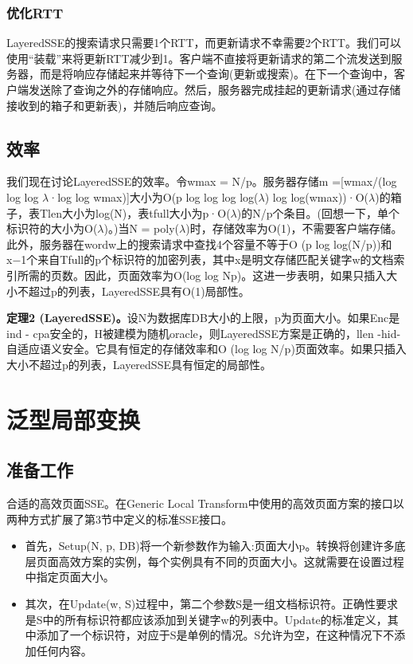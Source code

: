 \documentclass[UTF8]{article}
\begin{document}
\subsubsection{优化RTT}
LayeredSSE的搜索请求只需要1个RTT，而更新请求不幸需要2个RTT。我们可以使用“装载”来将更新RTT减少到1。客户端不直接将更新请求的第二个流发送到服务器，而是将响应存储起来并等待下一个查询(更新或搜索)。在下一个查询中，客户端发送除了查询之外的存储响应。然后，服务器完成挂起的更新请求(通过存储接收到的箱子和更新表)，并随后响应查询。

\subsection{效率}
我们现在讨论LayeredSSE的效率。令wmax = N/p。服务器存储m =[wmax/(log log log $\lambda$·log log wmax)]大小为O(p log log log log($\lambda$) log log(wmax))·O($\lambda$)的箱子，表Tlen大小为log(N)，表tfull大小为p·O($\lambda$)的N/p个条目。(回想一下，单个标识符的大小为O($\lambda$)。)当N = poly($\lambda$)时，存储效率为O(1)，不需要客户端存储。此外，服务器在wordw上的搜索请求中查找4个容量不等于O (p log log(N/p))和x−1个来自Tfull的p个标识符的加密列表，其中x是明文存储匹配关键字w的文档索引所需的页数。因此，页面效率为O(log log Np)。这进一步表明，如果只插入大小不超过p的列表，LayeredSSE具有O(1)局部性。

\textbf{定理2 (LayeredSSE)。}设N为数据库DB大小的上限，p为页面大小。如果Enc是ind - cpa安全的，H被建模为随机oracle，则LayeredSSE方案是正确的，llen -hid-自适应语义安全。它具有恒定的存储效率和O (log log N/p)页面效率。如果只插入大小不超过p的列表，LayeredSSE具有恒定的局部性。

\section{泛型局部变换}
\subsection{准备工作}
合适的高效页面SSE。在Generic Local Transform中使用的高效页面方案的接口以两种方式扩展了第3节中定义的标准SSE接口。

\begin{itemize}
  \item 首先，Setup(N, p, DB)将一个新参数作为输入:页面大小p。转换将创建许多底层页面高效方案的实例，每个实例具有不同的页面大小。这就需要在设置过程中指定页面大小。
  \item 其次，在Update(w, S)过程中，第二个参数S是一组文档标识符。正确性要求是S中的所有标识符都应该添加到关键字w的列表中。Update的标准定义，其中添加了一个标识符，对应于S是单例的情况。S允许为空，在这种情况下不添加任何内容。
\end{itemize}
\end{document}
